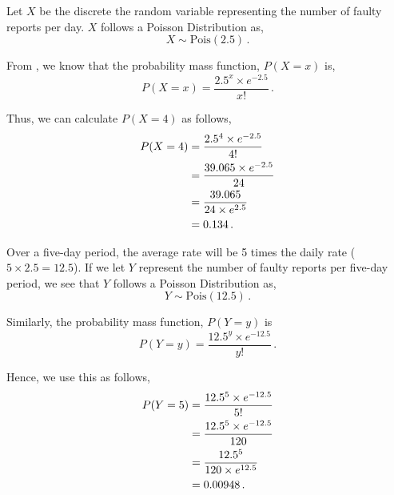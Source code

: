 \begin{subquestions}
\subquestion

Let $X$ be the discrete the random variable representing the number of faulty reports per day. $X$ follows a Poisson Distribution as,
\begin{equation}
	X \sim \text{Pois}(2.5) \,.
\end{equation}

\begin{subsubquestions}
	
\subsubquestion

From , we know that the probability mass function, $P(X=x)$ is,
\begin{equation}
	P(X=x) = \frac{2.5^x \times e^{-2.5}}{x!} \,.
\end{equation}

Thus, we can calculate $P(X=4)$ as follows,
\begin{align}
	P(X=4) & = \frac{2.5^4 \times e^{-2.5}}{4!} \nonumber \\
	       & = \frac{39.065 \times e^{-2.5}}{24} \nonumber \\
	       & = \frac{39.065}{24 \times e^{2.5}} \nonumber \\
	       & = 0.134 \,.
\end{align}
	

\subsubquestion

Over a five-day period, the average rate will be 5 times the daily rate ($5 \times 2.5 = 12.5$). If we let $Y$ represent the number of faulty reports per five-day period, we see that $Y$ follows a Poisson Distribution as,
\begin{equation}
	Y \sim \text{Pois}(12.5) \,.
\end{equation}

Similarly, the probability mass function, $P(Y=y)$ is
\begin{equation}
	P(Y=y) = \frac{12.5^y \times e^{-12.5}}{y!} \,.
\end{equation}

Hence, we use this as follows,
\begin{align}
	P(Y=5) & = \frac{12.5^5 \times e^{-12.5}}{5!} \nonumber \\
	       & = \frac{12.5^5 \times e^{-12.5}}{120} \nonumber \\
	       & = \frac{12.5^5}{120 \times e^{12.5}} \nonumber \\
	       & = 0.00948 \,.
\end{align}

\end{subsubquestions}
\end{subquestions}